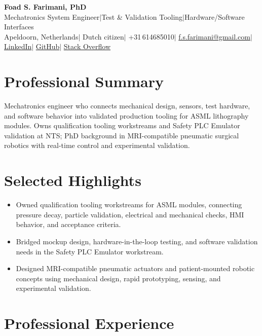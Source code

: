 \documentclass[10pt,a4paper]{article}
\begin{document}
\begin{center}
 {\LARGE\bfseries Foad S. Farimani, PhD} \\[3pt]
 {\small Mechatronics System Engineer\enspace$\mid$\enspace Test \& Validation Tooling\enspace$\mid$\enspace Hardware/Software Interfaces}
 \\[3pt]
 {\footnotesize
  Apeldoorn, Netherlands\enspace$\mid$\enspace
  Dutch citizen\enspace$\mid$\enspace
  +31\,614685010\enspace$\mid$\enspace
  \href{mailto:f.s.farimani@gmail.com}{f.s.farimani@gmail.com}\enspace$\mid$\enspace
  \href{https://linkedin.com/in/fsfarimani}{LinkedIn}\enspace$\mid$\enspace
  \href{https://github.com/Foadsf}{GitHub}\enspace$\mid$\enspace
  \href{https://stackoverflow.com/users/4999991}{Stack Overflow}
 }
\end{center}

\section{Professional Summary}
Mechatronics engineer who connects mechanical design, sensors, test hardware, and software behavior into validated production tooling for ASML lithography modules. Owns qualification tooling workstreams and Safety PLC Emulator validation at NTS; PhD background in MRI-compatible pneumatic surgical robotics with real-time control and experimental validation.

\section{Selected Highlights}
\begin{itemize}
 \item Owned qualification tooling workstreams for ASML modules, connecting pressure decay, particle validation, electrical and mechanical checks, HMI behavior, and acceptance criteria.
 \item Bridged mockup design, hardware-in-the-loop testing, and software validation needs in the Safety PLC Emulator workstream.
 \item Designed MRI-compatible pneumatic actuators and patient-mounted robotic concepts using mechanical design, rapid prototyping, sensing, and experimental validation.
\end{itemize}

\section{Professional Experience}
\end{document}
